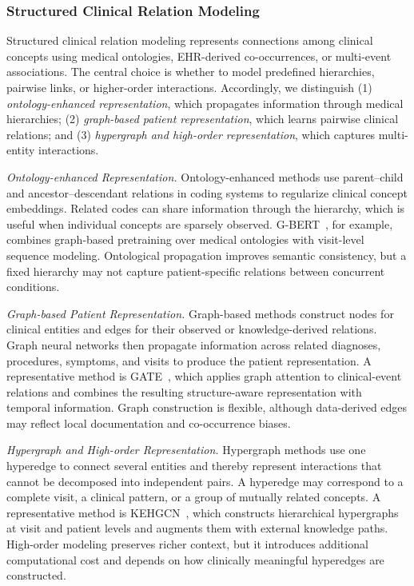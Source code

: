 \documentclass[manuscript,review]{acmart}
\begin{document}
\subsubsection{Structured Clinical Relation Modeling}

Structured clinical relation modeling represents connections among clinical concepts using medical ontologies, EHR-derived co-occurrences, or multi-event associations. The central choice is whether to model predefined hierarchies, pairwise links, or higher-order interactions. Accordingly, we distinguish (1) \textit{ontology-enhanced representation}, which propagates information through medical hierarchies; (2) \textit{graph-based patient representation}, which learns pairwise clinical relations; and (3) \textit{hypergraph and high-order representation}, which captures multi-entity interactions.

\textit{Ontology-enhanced Representation.} Ontology-enhanced methods use parent--child and ancestor--descendant relations in coding systems to regularize clinical concept embeddings. Related codes can share information through the hierarchy, which is useful when individual concepts are sparsely observed. G-BERT~\cite{shang2019gbert}, for example, combines graph-based pretraining over medical ontologies with visit-level sequence modeling. Ontological propagation improves semantic consistency, but a fixed hierarchy may not capture patient-specific relations between concurrent conditions.

\textit{Graph-based Patient Representation.} Graph-based methods construct nodes for clinical entities and edges for their observed or knowledge-derived relations. Graph neural networks then propagate information across related diagnoses, procedures, symptoms, and visits to produce the patient representation. A representative method is GATE~\cite{suGATEGraphAttentionAugmented2020}, which applies graph attention to clinical-event relations and combines the resulting structure-aware representation with temporal information. Graph construction is flexible, although data-derived edges may reflect local documentation and co-occurrence biases.

\textit{Hypergraph and High-order Representation.} Hypergraph methods use one hyperedge to connect several entities and thereby represent interactions that cannot be decomposed into independent pairs. A hyperedge may correspond to a complete visit, a clinical pattern, or a group of mutually related concepts. A representative method is KEHGCN~\cite{zhangKnowledgeEnhancedExplainableHypergraph2026}, which constructs hierarchical hypergraphs at visit and patient levels and augments them with external knowledge paths. High-order modeling preserves richer context, but it introduces additional computational cost and depends on how clinically meaningful hyperedges are constructed.
\end{document}
